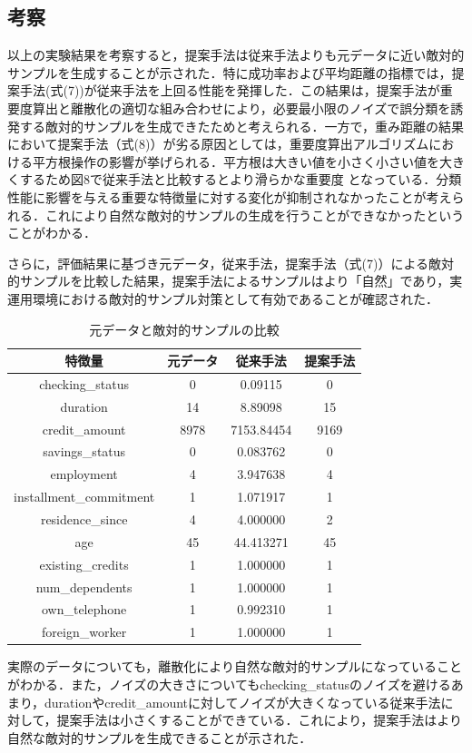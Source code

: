 \subsection{考察}
以上の実験結果を考察すると，提案手法は従来手法よりも元データに近い敵対的サンプルを生成することが示された．特に成功率および平均距離の指標では，提案手法(式(7))が従来手法を上回る性能を発揮した．この結果は，提案手法が重要度算出と離散化の適切な組み合わせにより，必要最小限のノイズで誤分類を誘発する敵対的サンプルを生成できたためと考えられる．一方で，重み距離の結果において提案手法（式(8)）が劣る原因としては，重要度算出アルゴリズムにおける平方根操作の影響が挙げられる．平方根は大きい値を小さく小さい値を大きくするため図8で従来手法と比較するとより滑らかな重要度
となっている．分類性能に影響を与える重要な特徴量に対する変化が抑制されなかったことが考えられる．これにより自然な敵対的サンプルの生成を行うことができなかったということがわかる．

さらに，評価結果に基づき元データ，従来手法，提案手法（式(7)）による敵対的サンプルを比較した結果，提案手法によるサンプルはより「自然」であり，実運用環境における敵対的サンプル対策として有効であることが確認された．

\begin{table}[H]
    \centering
    \caption{元データと敵対的サンプルの比較}
    \begin{tabular}{|c|c|c|c|} \hline
        特徴量 & 元データ & 従来手法 & 提案手法 \\ \hline
        checking\_status & 0 & 0.09115 & 0\\ \hline
        duration & 14 & 8.89098 & 15 \\ \hline
        credit\_amount & 8978 & 7153.84454 & 9169 \\ \hline
        savings\_status & 0 & 0.083762 & 0\\ \hline
        employment & 4 & 3.947638  & 4 \\ \hline
        installment\_commitment & 1 & 1.071917 & 1\\ \hline
        residence\_since & 4 & 4.000000 & 2 \\ \hline
        age & 45 & 44.413271 & 45 \\ \hline
        existing\_credits & 1 & 1.000000 & 1 \\ \hline
        num\_dependents & 1 & 1.000000 & 1 \\ \hline
        own\_telephone & 1 & 0.992310 & 1 \\ \hline
        foreign\_worker & 1 & 1.000000 & 1 \\ \hline
    \end{tabular}
\end{table}

実際のデータについても，離散化により自然な敵対的サンプルになっていることがわかる．また，ノイズの大きさについてもchecking\_statusのノイズを避けるあまり，durationやcredit\_amountに対してノイズが大きくなっている従来手法に対して，提案手法は小さくすることができている．これにより，提案手法はより自然な敵対的サンプルを生成できることが示された．